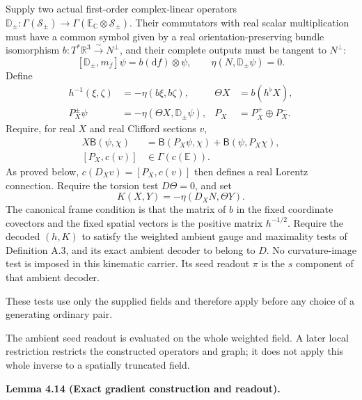 \documentclass[
  english,
  11pt,
  reqno]{amsart}
\makeatletter
\newcommand{\pandocstatementheading}[1]{%
  \par\if@nobreak\else
    \addpenalty{\@beginparpenalty}%
    \addvspace{.5\baselineskip plus .2\baselineskip minus .2\baselineskip}%
  \fi
  {\normalfont\bfseries #1\par}%
  \nobreak\@afterindenttrue\@afterheading
}
\makeatother
\begin{document}
Supply two actual first-order complex-linear operators
\(\mathbb D_\pm:\Gamma(\mathscr S_\pm)\to\Gamma(\mathbb E_{\mathbb C}\otimes\mathscr S_\pm)\).
Their commutators with real scalar multiplication must have a common
symbol given by a real orientation-preserving bundle isomorphism
\(b:T^*\mathbb R^3\xrightarrow{\sim}N^\perp\), and their complete
outputs must be tangent to \(N^\perp\):%
 \[
[\mathbb D_\pm,m_f]\psi=b(\mathrm df)\otimes\psi,
\qquad \eta(N,\mathbb D_\pm\psi)=0.
\] Define%
 \[
\begin{aligned}
h^{-1}(\xi,\zeta)&=-\eta(b\xi,b\zeta),
&\Theta X&=b(h^\flat X),\\
P_X^\pm\psi&=-\eta(\Theta X,\mathbb D_\pm\psi),
&P_X&=P_X^+\oplus P_X^-.
\end{aligned}
\] Require, for real \(X\) and real Clifford sections \(v\),%
 \[
\begin{aligned}
X\mathsf B(\psi,\chi)
&=\mathsf B(P_X\psi,\chi)+\mathsf B(\psi,P_X\chi),\\
[P_X,c(v)]&\in\Gamma(c(\mathbb E)).
\end{aligned}
\] As proved below, \(c(D_Xv)=[P_X,c(v)]\) then defines a real Lorentz
connection. Require the torsion test \(D\Theta=0\), and set%
 \[
K(X,Y)=-\eta(D_XN,\Theta Y).
\] The canonical frame condition is that the matrix of \(b\) in the
fixed coordinate covectors and the fixed spatial vectors is the positive
matrix \(h^{-1/2}\). Require the decoded \((h,K)\) to satisfy the
weighted ambient gauge and maximality tests of Definition A.3, and its
exact ambient decoder to belong to \(D\). No curvature-image test is
imposed in this kinematic carrier. Its seed readout \(\pi\) is the \(s\)
component of that ambient decoder.

These tests use only the supplied fields and therefore apply before any
choice of a generating ordinary pair.

The ambient seed readout is evaluated on the whole weighted field. A
later local restriction restricts the constructed operators and graph;
it does not apply this whole inverse to a spatially truncated field.

\pandocstatementheading{\leavevmode{}\label{lem:online-gradient-exact-kinematic-codec}Lemma 4.14 (Exact gradient construction and readout).}
\end{document}
